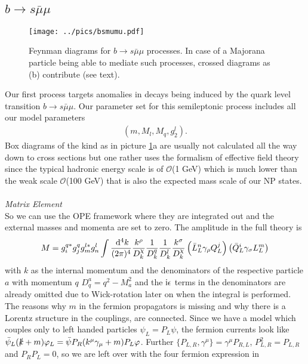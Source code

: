 \subsection{$b\rightarrow s\bar\mu\mu$}
\label{sec_bsmumu}
\begin{figure}[t]
 \texttt{[image: ../pics/bsmumu.pdf]}
 \caption{Feynman diagrams for $b\rightarrow s \bar\mu\mu$ processes. In case of a Majorana particle being able to mediate such processes, crossed
 diagrams as (b) contribute (see text).}
 \label{pic_Bsmumu}
\end{figure}
Our first process targets anomalies in decays being induced by the quark level transition $b\rightarrow s\bar\mu\mu$. Our parameter set for this 
semileptonic process includes all our model parameters
\begin{align}
 \left(m, M_l, M_q, g_2^l\right).
\end{align}
Box diagrams of the kind as in picture \ref{pic_Bsmumu}a are usually not calculated 
all the way down to cross sections but one rather uses the formalism of effective field theory since the typical hadronic energy scale is of
$\mathcal{O}$(1 GeV) which is much lower than the weak scale $\mathcal{O}$(100 GeV) that is also the expected mass scale of our NP states. 
\\ \\ \noindent \textit{Matrix Element}\\
\noindent So we can use 
the OPE framework where they are integrated out and the external masses and momenta are set to zero. The amplitude in the full theory is
\begin{align}
 M =g_i^{q*} g_j^{q} g_m^{l*} g_n^l\int \frac{\; \mathrm{d}^4 k}{(2\pi)^4} \frac{k^\rho}{D^\chi_k}\frac{1}{D^q_k} \frac{1}{D^l_k} \frac{k^\sigma}{D^\chi_k} \left(\bar L_L^n \gamma_\rho Q_L^j\right) \left(\bar Q_L^i \gamma_\sigma L_L^m\right)
 \label{eq_matElemBSmumu}
\end{align}
with $k$ as the internal momentum and the denominators of the respective particle $a$ with momentum $q$ $D^a_q = q^2-M_a^2$ and the $\text{i}\epsilon$ terms in the denominators are already omitted
due to Wick-rotation later on when the integral is performed. The reasons why $m$ in the fermion propagators is missing
and why there is a Lorentz structure in the couplings, are connected. Since we have a model which couples only to left handed particles $\psi_L = P_L \psi$,
the fermion currents look like $\bar \psi_L (\slashed{k}+m)\varphi_L = \bar \psi P_R (k^\mu \gamma_\mu+m) P_L\varphi$. Further
$\{P_{L,R},\gamma^\mu\} = \gamma^\mu P_{R,L}$, $P_{L,R}^2 = P_{L,R}$ and $P_R P_L = 0$, so we are left over with the four fermion expression in 
